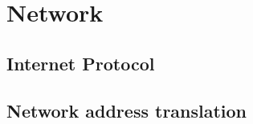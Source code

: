 \section{Network}
\lipsum[1]
\subsection{Internet Protocol}
\lipsum[7-8]
\subsection{Network address translation}
\lipsum[9-10]